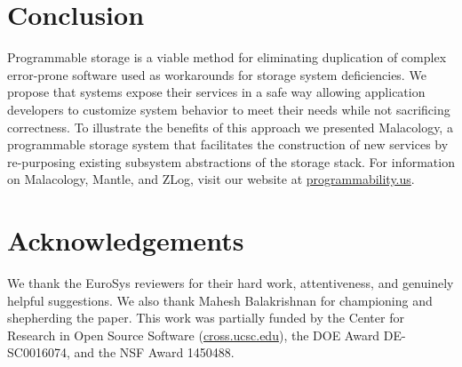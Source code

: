 \section{Conclusion}
\label{conclusion-and-future-work}

Programmable storage is a viable method for eliminating duplication of complex
error-prone software used as workarounds for storage system deficiencies. We
propose that systems expose their services in a safe way allowing application
developers to customize system behavior to meet their needs while not
sacrificing correctness. To illustrate the benefits of this approach we
presented Malacology, a programmable storage system that facilitates the
construction of new services by re-purposing existing subsystem abstractions of
the storage stack. For information on Malacology, Mantle, and ZLog, visit our
website at \href{programmability.us}{programmability.us}.


\section{Acknowledgements}

We thank the EuroSys reviewers for their hard work, attentiveness, and
genuinely helpful suggestions. We also thank Mahesh Balakrishnan for
championing and shepherding the paper. This work was partially funded by the
Center for Research in Open Source Software
(\href{cross.ucsc.edu}{cross.ucsc.edu}), the DOE Award DE-SC0016074, and the
NSF Award 1450488.

